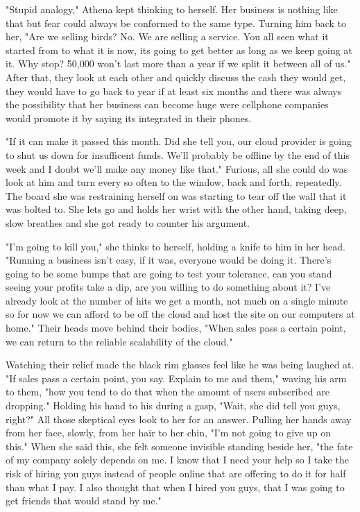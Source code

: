         "Stupid analogy," Athena kept thinking to herself. Her business is nothing like that but fear could always be conformed to the same 
    type. Turning him back to her, "Are we selling birds? No. We are selling a service. You all seen what it started from to what it is now,
    its going to get better as long as we keep going at it. Why stop? 50,000 won't last more than a year if we split it between all of us."
    After that, they look at each other and quickly discuss the cash they would get, they would have to go back to year if at least six months
    and there was always the possibility that her business can become huge were cellphone companies would promote it by saying its integrated
    in their phones.

        "If it can make it passed this month. Did she tell you, our cloud provider is going to shut us down for insufficent funds. We'll 
    probably be offline by the end of this week and I doubt we'll make any money like that." Furious, all she could do was look at him and
    turn every so often to the window, back and forth, repeatedly. The board she was restraining herself on was starting to tear off the wall
    that it was bolted to. She lets go and holds her wrist with the other hand, taking deep, slow breathes and she got ready to counter his
    argument.

        "I'm going to kill you," she thinks to herself, holding a knife to him in her head. "Running a business isn't easy, if it was, 
    everyone would be doing it. There's going to be some bumps that are going to test your tolerance, can you stand seeing your profits take
    a dip, are you willing to do something about it? I've already look at the number of hits we get a month, not much on a single minute so 
    for now we can afford to be off the cloud and host the site on our computers at home." Their heads move behind their bodies, "When sales
    pass a certain point, we can return to the reliable scalability of the cloud." 

       Watching their relief made the black rim glasses feel like he was being laughed at. "If sales pass a certain point, you say. Explain to
    me and them," waving his arm to them, "how you tend to do that when the amount of users subscribed are dropping." Holding his hand to his
    during a gasp, "Wait, she did tell you guys, right?" All those skeptical eyes look to her for an answer. Pulling her hands away from her
    face, slowly, from her hair to her chin, "I'm not going to give up on this." When she said this, she felt someone invisible standing beside
    her, "the fate of my company solely depends on me. I know that I need your help so I take the risk of hiring you guys instead of people
    online that are offering to do it for half than what I pay. I also thought that when I hired you guys, that I was going to get friends that
    would stand by me."

